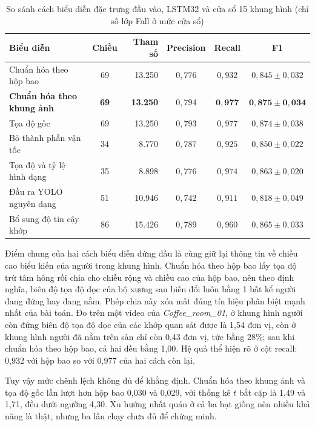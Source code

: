 \begin{table}[htbp]
\centering
\caption{So sánh cách biểu diễn đặc trưng đầu vào, LSTM32 và cửa sổ 15 khung hình (chỉ số lớp Fall ở mức cửa sổ)}
\label{tab:lstm_feature_sweep}
\footnotesize
\setlength{\tabcolsep}{3.5pt}
\begin{tabular}{|l|c|r|c|c|c|}
\hline
\textbf{Biểu diễn} & \textbf{Chiều} & \textbf{Tham số} & \textbf{Precision} & \textbf{Recall} & \textbf{F1} \\
\hline
Chuẩn hóa theo hộp bao & 69 & 13.250 & $0{,}776$ & $0{,}932$ & $0{,}845\pm0{,}032$ \\
\hline
\textbf{Chuẩn hóa theo khung ảnh} & \textbf{69} & \textbf{13.250} & $0{,}794$ & $\mathbf{0{,}977}$ & $\mathbf{0{,}875\pm0{,}034}$ \\
\hline
Tọa độ gốc & 69 & 13.250 & $0{,}793$ & $0{,}977$ & $0{,}874\pm0{,}038$ \\
\hline
Bỏ thành phần vận tốc & 34 & 8.770 & $0{,}787$ & $0{,}925$ & $0{,}850\pm0{,}022$ \\
\hline
Tọa độ và tỷ lệ hình dạng & 35 & 8.898 & $0{,}776$ & $0{,}974$ & $0{,}863\pm0{,}020$ \\
\hline
Đầu ra YOLO nguyên dạng & 51 & 10.946 & $0{,}742$ & $0{,}911$ & $0{,}818\pm0{,}049$ \\
\hline
Bổ sung độ tin cậy khớp & 86 & 15.426 & $0{,}789$ & $0{,}960$ & $0{,}865\pm0{,}033$ \\
\hline
\end{tabular}
\end{table}

Điểm chung của hai cách biểu diễn đứng đầu là cùng giữ lại thông tin về chiều cao biểu kiến của người trong khung hình. Chuẩn hóa theo hộp bao lấy tọa độ trừ tâm hông rồi chia cho chiều rộng và chiều cao của hộp bao, nên theo định nghĩa, biên độ tọa độ dọc của bộ xương sau biến đổi luôn bằng 1 bất kể người đang đứng hay đang nằm. Phép chia này xóa mất đúng tín hiệu phân biệt mạnh nhất của bài toán. Đo trên một video của \textit{Coffee\_room\_01}, ở khung hình người còn đứng biên độ tọa độ dọc của các khớp quan sát được là 1,54 đơn vị, còn ở khung hình người đã nằm trên sàn chỉ còn 0,43 đơn vị, tức bằng 28\%; sau khi chuẩn hóa theo hộp bao, cả hai đều bằng 1,00. Hệ quả thể hiện rõ ở cột recall: 0,932 với hộp bao so với 0,977 của hai cách còn lại.

Tuy vậy mức chênh lệch không đủ để khẳng định. Chuẩn hóa theo khung ảnh và tọa độ gốc lần lượt hơn hộp bao 0,030 và 0,029, với thống kê $t$ bắt cặp là 1,49 và 1,71, đều dưới ngưỡng 4,30. Xu hướng nhất quán ở cả ba hạt giống nên nhiều khả năng là thật, nhưng ba lần chạy chưa đủ để chứng minh.

